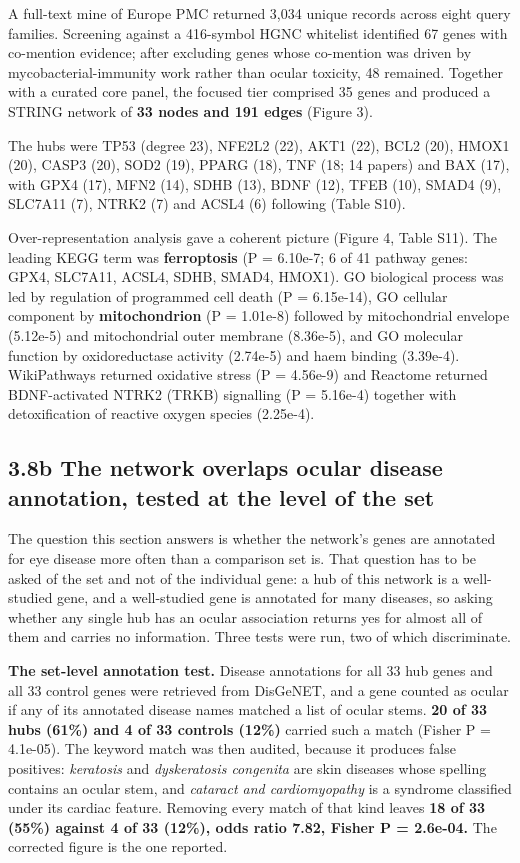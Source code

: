 \documentclass[utf8]{FrontiersinVancouver}
\begin{document}
A full-text mine of Europe PMC returned 3,034 unique records across eight query families. Screening against a 416-symbol HGNC whitelist identified 67 genes with co-mention evidence; after excluding genes whose co-mention was driven by mycobacterial-immunity work rather than ocular toxicity, 48 remained. Together with a curated core panel, the focused tier comprised 35 genes and produced a STRING network of \textbf{33 nodes and 191 edges} (Figure 3).

The hubs were TP53 (degree 23), NFE2L2 (22), AKT1 (22), BCL2 (20), HMOX1 (20), CASP3 (20), SOD2 (19), PPARG (18), TNF (18; 14 papers) and BAX (17), with GPX4 (17), MFN2 (14), SDHB (13), BDNF (12), TFEB (10), SMAD4 (9), SLC7A11 (7), NTRK2 (7) and ACSL4 (6) following (Table S10).

Over-representation analysis gave a coherent picture (Figure 4, Table S11). The leading KEGG term was \textbf{ferroptosis} (P = 6.10e-7; 6 of 41 pathway genes: GPX4, SLC7A11, ACSL4, SDHB, SMAD4, HMOX1). GO biological process was led by regulation of programmed cell death (P = 6.15e-14), GO cellular component by \textbf{mitochondrion} (P = 1.01e-8) followed by mitochondrial envelope (5.12e-5) and mitochondrial outer membrane (8.36e-5), and GO molecular function by oxidoreductase activity (2.74e-5) and haem binding (3.39e-4). WikiPathways returned oxidative stress (P = 4.56e-9) and Reactome returned BDNF-activated NTRK2 (TRKB) signalling (P = 5.16e-4) together with detoxification of reactive oxygen species (2.25e-4).

\subsection{3.8b The network overlaps ocular disease annotation, tested at the level of the set}

The question this section answers is whether the network's genes are annotated for eye disease more often than a comparison set is. That question has to be asked of the set and not of the individual gene: a hub of this network is a well-studied gene, and a well-studied gene is annotated for many diseases, so asking whether any single hub has an ocular association returns yes for almost all of them and carries no information. Three tests were run, two of which discriminate.

\textbf{The set-level annotation test.} Disease annotations for all 33 hub genes and all 33 control genes were retrieved from DisGeNET, and a gene counted as ocular if any of its annotated disease names matched a list of ocular stems. \textbf{20 of 33 hubs (61\%) and 4 of 33 controls (12\%)} carried such a match (Fisher P = 4.1e-05). The keyword match was then audited, because it produces false positives: \textit{keratosis} and \textit{dyskeratosis congenita} are skin diseases whose spelling contains an ocular stem, and \textit{cataract and cardiomyopathy} is a syndrome classified under its cardiac feature. Removing every match of that kind leaves \textbf{18 of 33 (55\%) against 4 of 33 (12\%), odds ratio 7.82, Fisher P = 2.6e-04.} The corrected figure is the one reported.
\end{document}
